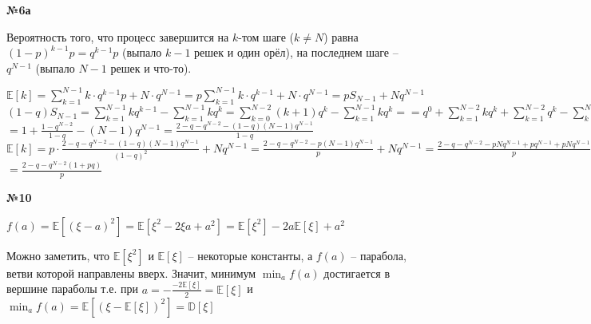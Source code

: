 \documentclass{article}
\newcommand{\E}[1]{\mathbb{E}[ #1 ]}
\newcommand{\D}[1]{\mathbb{D}[ #1 ]}
\newenvironment{task}{\begin{center}\fontsize{14}{14}\selectfont\bf}{\rm\fontsize{12}{12}\selectfont\end{center}}
\begin{document}
	\begin{task} 
		№6а
	\end{task}
	Вероятность того, что процесс завершится на $k$-том шаге ($k\not=N$) равна $(1 - p)^{k-1}p = q^{k-1}p$ (выпало $k-1$ решек и один орёл), на последнем шаге -- $q^{N-1}$ (выпало $N-1$ решек и что-то).
	\begin{center}
		$\E{k} = \sum\limits_{k = 1}^{N-1}k\cdot q^{k-1}p  + N\cdot q^{N-1} = p\sum\limits_{k = 1}^{N-1}k\cdot q^{k-1}  + N\cdot q^{N-1} = pS_{N-1} + Nq^{N-1}$\\\vspace{5px}
		$(1 - q)S_{N-1} = \sum\limits_{k = 1}^{N-1}kq^{k-1} - \sum\limits_{k = 1}^{N-1}kq^{k} 
		 = \sum\limits_{k = 0}^{N-2}(k+1)q^{k} - \sum\limits_{k = 1}^{N-1}kq^{k} = 
		 = q^0 + \sum\limits_{k = 1}^{N-2}kq^{k} + \sum\limits_{k = 1}^{N-2}q^{k} - \sum\limits_{k = 1}^{N-2}kq^{k} - (N-1)q^{N-1} =$\\\vspace{5px}$
		 = 1 + \frac{1 - q^{N-2}}{1 - q} - (N-1)q^{N-1} = \frac{2 - q - q^{N-2} - (1-q)(N-1)q^{N-1}}{1 - q}$ \\ \vspace{5px}
		 $\E{k} = p\cdot \frac{2 - q - q^{N-2} - (1-q)(N-1)q^{N-1}}{(1 - q)^2} + Nq^{N-1} 
				= \frac{2 - q - q^{N-2} - p(N-1)q^{N-1}}{p} + Nq^{N-1} 
				= \frac{2 - q - q^{N-2} - pNq^{N-1} + pq^{N-1} + pNq^{N-1}}{p} = $\\\vspace{5px}$
				= \frac{2 - q - q^{N-2}(1 + pq)}{p}$
	\end{center}
	
	
	
		
	\begin{task} 
		№10
	\end{task}
	\begin{center}
		$f(a) = \E{(\xi - a)^2} = \E{\xi^2 - 2\xi a + a^2} = \E{\xi^2} - 2a\E{\xi} + a^2$\\
	\end{center}
	Можно заметить, что $\E{\xi^2}$ и $\E{\xi}$ -- некоторые константы, а $f(a)$ -- парабола, ветви которой направлены вверх. Значит, минимум $\min_a f(a)$ достигается в вершине параболы т.е. при $a = - \frac{-2\E{\xi}}{2} = \E{\xi}$ и $\min_a f(a) = \E{(\xi - \E{\xi})^2} = \D{\xi}$
	
			
\end{document}
